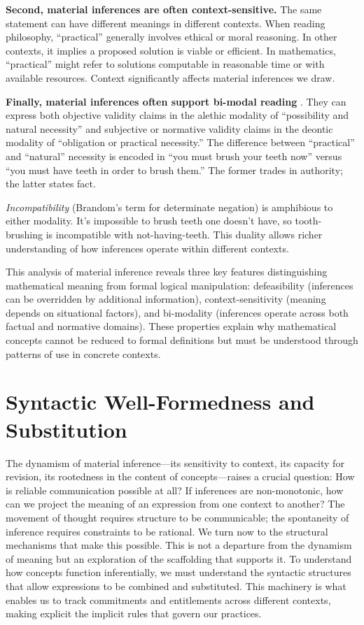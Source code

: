 \documentclass[12pt]{book}
\begin{document}
\textbf{Second, material inferences are often context-sensitive.} The same statement can have different meanings in different contexts. When reading philosophy, ``practical'' generally involves ethical or moral reasoning. In other contexts, it implies a proposed solution is viable or efficient. In mathematics, ``practical'' might refer to solutions computable in reasonable time or with available resources. Context significantly affects material inferences we draw.

\textbf{Finally, material inferences often support bi-modal reading} \parencite[73-74]{Brandom:2019aa}. They can express both objective validity claims in the alethic modality of ``possibility and natural necessity'' and subjective or normative validity claims in the deontic modality of ``obligation or practical necessity.'' The difference between ``practical'' and ``natural'' necessity is encoded in ``you must brush your teeth now'' versus ``you must have teeth in order to brush them.'' The former trades in authority; the latter states fact.

\emph{Incompatibility} (Brandom's term for determinate negation) is amphibious to either modality. It's impossible to brush teeth one doesn't have, so tooth-brushing is incompatible with not-having-teeth. This duality allows richer understanding of how inferences operate within different contexts.

This analysis of material inference reveals three key features distinguishing mathematical meaning from formal logical manipulation: defeasibility (inferences can be overridden by additional information), context-sensitivity (meaning depends on situational factors), and bi-modality (inferences operate across both factual and normative domains). These properties explain why mathematical concepts cannot be reduced to formal definitions but must be understood through patterns of use in concrete contexts.

\section{Syntactic Well-Formedness and Substitution}\label{syntactic-well-formedness-and-substitution}

The dynamism of material inference---its sensitivity to context, its capacity for revision, its rootedness in the content of concepts---raises a crucial question: How is reliable communication possible at all? If inferences are non-monotonic, how can we project the meaning of an expression from one context to another? The movement of thought requires structure to be communicable; the spontaneity of inference requires constraints to be rational. We turn now to the structural mechanisms that make this possible. This is not a departure from the dynamism of meaning but an exploration of the scaffolding that supports it. To understand how concepts function inferentially, we must understand the syntactic structures that allow expressions to be combined and substituted. This machinery is what enables us to track commitments and entitlements across different contexts, making explicit the implicit rules that govern our practices.
\end{document}
